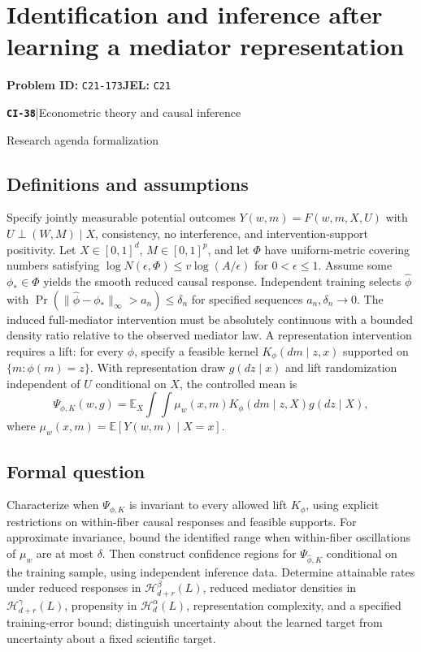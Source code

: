 \documentclass[11pt,a4paper]{article}
\newcommand{\E}{\mathbb E}
\newcommand{\entrymeta}[3]{{\sffamily\small\color{muted}\textbf{\texttt{#1}}\quad|\quad #2\par #3\par}}
\begin{document}
\section*{Identification and inference after learning a mediator representation}
\textbf{Problem ID:} \texttt{C21-173}\quad \textbf{JEL:} \texttt{C21}\par
\label{problem:OP-0517}
\label{beyond:CI-38}
\entrymeta{CI-38}{Econometric theory and causal inference}{Research agenda formalization}
\subsection*{Definitions and assumptions}
Specify jointly measurable potential outcomes $Y(w,m)=F(w,m,X,U)$ with $U\perp(W,M)\mid X$, consistency, no interference, and intervention-support positivity. Let $X\in[0,1]^d$, $M\in[0,1]^p$, and let $\Phi$ have uniform-metric covering numbers satisfying $\log N(\epsilon,\Phi)\leq v\log(A/\epsilon)$ for $0<\epsilon\leq1$. Assume some $\phi_*\in\Phi$ yields the smooth reduced causal response. Independent training selects $\widehat\phi$ with $\Pr(\|\widehat\phi-\phi_*\|_\infty>a_n)\leq\delta_n$ for specified sequences $a_n,\delta_n\to0$. The induced full-mediator intervention must be absolutely continuous with a bounded density ratio relative to the observed mediator law. A representation intervention requires a lift: for every $\phi$, specify a feasible kernel $K_\phi(dm\mid z,x)$ supported on $\{m:\phi(m)=z\}$. With representation draw $g(dz\mid x)$ and lift randomization independent of $U$ conditional on $X$, the controlled mean is
\[
 \Psi_{\phi,K}(w,g)=
 \E_X\int\!\int\mu_w(x,m)K_\phi(dm\mid z,X)g(dz\mid X),
\]
where $\mu_w(x,m)=\E[Y(w,m)\mid X=x]$.
\subsection*{Formal question}
Characterize when $\Psi_{\phi,K}$ is invariant to every allowed lift $K_\phi$, using explicit restrictions on within-fiber causal responses and feasible supports. For approximate invariance, bound the identified range when within-fiber oscillations of $\mu_w$ are at most $\delta$. Then construct confidence regions for $\Psi_{\widehat\phi,K}$ conditional on the training sample, using independent inference data. Determine attainable rates under reduced responses in $\mathcal H_{d+r}^\beta(L)$, reduced mediator densities in $\mathcal H_{d+r}^\gamma(L)$, propensity in $\mathcal H_d^\alpha(L)$, representation complexity, and a specified training-error bound; distinguish uncertainty about the learned target from uncertainty about a fixed scientific target.
\end{document}
